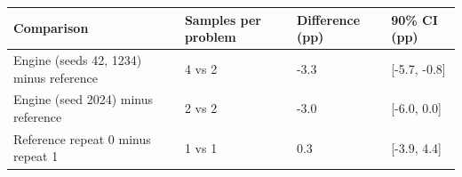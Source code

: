 \begin{tabular}{llll}
\toprule
Comparison & Samples per problem & Difference (pp) & 90\% CI (pp) \\
\midrule
Engine (seeds 42, 1234) minus reference & 4 vs 2 & -3.3 & [-5.7, -0.8] \\
Engine (seed 2024) minus reference & 2 vs 2 & -3.0 & [-6.0, 0.0] \\
Reference repeat 0 minus repeat 1 & 1 vs 1 & 0.3 & [-3.9, 4.4] \\
\bottomrule
\end{tabular}

